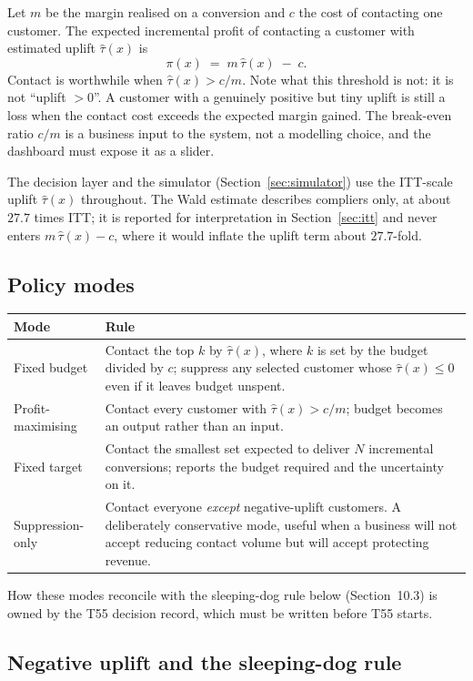 \documentclass[11pt,a4paper]{article}
\begin{document}
Let $m$ be the margin realised on a conversion and $c$ the cost of contacting one customer. The
expected incremental profit of contacting a customer with estimated uplift $\hat\tau(x)$ is
\[
\pi(x) \;=\; m\,\hat\tau(x) \;-\; c .
\]
Contact is worthwhile when $\hat\tau(x) > c/m$. Note what this threshold is not: it is not
``uplift $> 0$''. A customer with a genuinely positive but tiny uplift is still a loss when the
contact cost exceeds the expected margin gained. The break-even ratio $c/m$ is a business input to
the system, not a modelling choice, and the dashboard must expose it as a slider.

The decision layer and the simulator (Section~\ref{sec:simulator}) use the ITT-scale uplift
$\hat\tau(x)$ throughout. The Wald estimate describes compliers only, at about $27.7$ times ITT; it
is reported for interpretation in Section~\ref{sec:itt} and never enters $m\,\hat\tau(x) - c$,
where it would inflate the uplift term about $27.7$-fold.

\subsection{Policy modes}

\begin{tabularx}{\textwidth}{@{}L{3.6cm}X@{}}
\toprule
\textbf{Mode} & \textbf{Rule} \\
\midrule
Fixed budget & Contact the top $k$ by $\hat\tau(x)$, where $k$ is set by the budget divided by
$c$; suppress any selected customer whose $\hat\tau(x) \le 0$ even if it leaves budget unspent. \\
Profit-maximising & Contact every customer with $\hat\tau(x) > c/m$; budget becomes an output
rather than an input. \\
Fixed target & Contact the smallest set expected to deliver $N$ incremental conversions;
reports the budget required and the uncertainty on it. \\
Suppression-only & Contact everyone \emph{except} negative-uplift customers. A deliberately
conservative mode, useful when a business will not accept reducing contact volume but will accept
protecting revenue. \\
\bottomrule
\end{tabularx}

How these modes reconcile with the sleeping-dog rule below (Section~10.3) is owned by the T55
decision record, which must be written before T55 starts.

\subsection{Negative uplift and the sleeping-dog rule}
\end{document}
